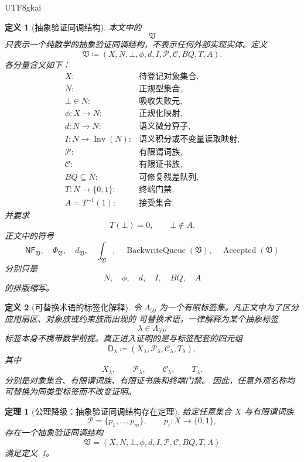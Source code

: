 \documentclass[12pt]{article}
\newtheorem{definition}{定义}[section]
\newtheorem{theorem}{定理}[section]
\newcommand{\Vsys}{\mathfrak V}
\newcommand{\NF}{\mathsf{NF}}
\newcommand{\DefEq}{\coloneqq}
\DeclareMathOperator{\Accepted}{Accepted}
\DeclareMathOperator{\Inv}{Inv}
\DeclareMathOperator{\BackwriteQueue}{BackwriteQueue}
\begin{document}
\begin{CJK*}{UTF8}{gkai}
\begin{definition}[抽象验证同调结构]
\label{def:tex59-abstract-vsys}
本文中的
\[
  \Vsys
\]
只表示一个纯数学的抽象验证同调结构，不表示任何外部实现实体。定义
\[
  \mathfrak V
  \DefEq
  (X,N,\bot,\phi,d,I,\mathcal P,\mathcal C,BQ,T,A).
\]
各分量含义如下：
\[
\begin{array}{ll}
  X: & \text{待登记对象集合},\\
  N: & \text{正规型集合},\\
  \bot\in N: & \text{吸收失败元},\\
  \phi:X\to N: & \text{正规化映射},\\
  d:N\to N: & \text{语义微分算子},\\
  I:N\to \Inv(N): & \text{语义积分或不变量读取映射},\\
  \mathcal P: & \text{有限谓词族},\\
  \mathcal C: & \text{有限证书族},\\
  BQ\subseteq N: & \text{可修复残差队列},\\
  T:N\to\{0,1\}: & \text{终端门禁},\\
  A=T^{-1}(1): & \text{接受集合}.
\end{array}
\]
并要求
\[
  T(\bot)=0,
  \qquad
  \bot\notin A.
\]
正文中的符号
\[
  \NF_{\Vsys},\quad
  \Phi_{\Vsys},\quad
  d_{\Vsys},\quad
  \int_{\Vsys},\quad
  \BackwriteQueue(\Vsys),\quad
  \Accepted(\Vsys)
\]
分别只是
\[
  N,\quad \phi,\quad d,\quad I,\quad BQ,\quad A
\]
的排版缩写。
\end{definition}

\begin{definition}[可替换术语的标签化解释]
\label{def:tex59-label-abstraction}
令 \(\Lambda_{59}\) 为一个有限标签集。凡正文中为了区分应用扇区、对象族或约束族而出现的
可替换术语，一律解释为某个抽象标签
\[
  \lambda\in\Lambda_{59}.
\]
标签本身不携带数学前提。真正进入证明的是与标签配套的四元组
\[
  \mathsf D_{\lambda}
  \DefEq
  (X_\lambda,\mathcal P_\lambda,\mathcal C_\lambda,T_\lambda),
\]
其中
\[
  X_\lambda,\qquad
  \mathcal P_\lambda,\qquad
  \mathcal C_\lambda,\qquad
  T_\lambda.
\]
分别是对象集合、有限谓词族、有限证书族和终端门禁。
因此，任意外观名称均可替换为同类型标签而不改变证明。
\end{definition}

\begin{theorem}[公理降级：抽象验证同调结构存在定理]
\label{thm:tex59-abstract-vsys-existence}
给定任意集合 \(X\) 与有限谓词族
\[
  \mathcal P=\{p_1,\ldots,p_m\},
  \qquad
  p_i:X\to\{0,1\},
\]
存在一个抽象验证同调结构
\[
  \mathfrak V
  =
  (X,N,\bot,\phi,d,I,\mathcal P,\mathcal C,BQ,T,A)
\]
满足定义~\ref{def:tex59-abstract-vsys}。
\end{theorem}


\end{CJK*}
\end{document}
